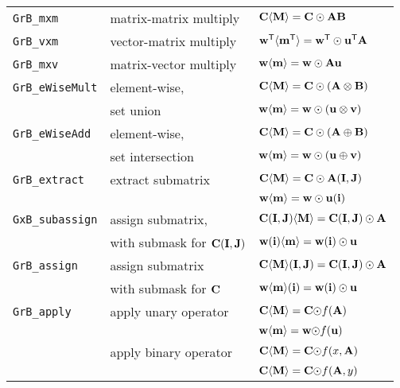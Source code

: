 \documentclass[12pt]{article}
\begin{document}
\vspace{0.2in}
{\small
\begin{tabular}{lll}
\hline
\verb'GrB_mxm'       & matrix-matrix multiply  & ${\bf C \langle M \rangle = C \odot AB}$ \\
\verb'GrB_vxm'       & vector-matrix multiply  & ${\bf w^{\sf T}\langle m^{\sf T}\rangle = w^{\sf T}\odot u^{\sf T}A}$ \\
\verb'GrB_mxv'       & matrix-vector multiply  & ${\bf w \langle m \rangle = w \odot Au}$ \\
\hline
\verb'GrB_eWiseMult' & element-wise,           & ${\bf C \langle M \rangle = C \odot (A \otimes B)}$ \\
                     & set union               & ${\bf w \langle m \rangle = w \odot (u \otimes v)}$ \\
\hline
\verb'GrB_eWiseAdd'  & element-wise,           & ${\bf C \langle M \rangle = C \odot (A \oplus  B)}$ \\
                     & set intersection        & ${\bf w \langle m \rangle = w \odot (u \oplus  v)}$ \\
\hline
\verb'GrB_extract'   & extract submatrix       & ${\bf C \langle M \rangle = C \odot A(I,J)}$ \\
                     &                         & ${\bf w \langle m \rangle = w \odot u(i)}$ \\
\hline
\verb'GxB_subassign' & assign submatrix,       & ${\bf C (I,J) \langle M \rangle = C(I,J) \odot A}$ \\
                     & with submask for ${\bf C(I,J)}$
                                               & ${\bf w (i)   \langle m \rangle = w(i)   \odot u}$ \\
\hline
\verb'GrB_assign'    & assign submatrix        & ${\bf C \langle M \rangle (I,J) = C(I,J) \odot A}$ \\
                     & with submask for ${\bf C}$
                                               & ${\bf w \langle m \rangle (i)   = w(i)   \odot u}$ \\
\hline
\verb'GrB_apply'     & apply unary operator    & ${\bf C \langle M \rangle = C \odot} f{\bf (A)}$ \\
                     &                         & ${\bf w \langle m \rangle = w \odot} f{\bf (u)}$ \\
                     & apply binary operator   & ${\bf C \langle M \rangle = C \odot} f(x,{\bf A})$ \\
                     &                         & ${\bf C \langle M \rangle = C \odot} f({\bf A},y)$ \\

\end{tabular}}
\end{document}

